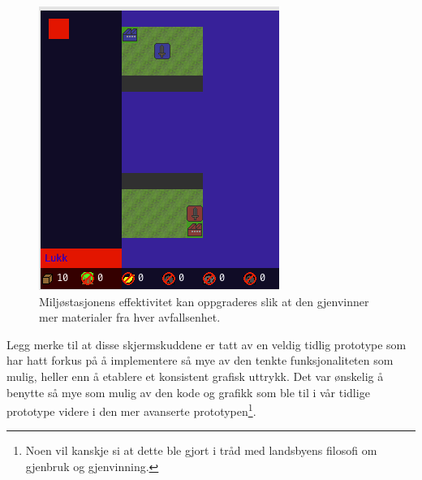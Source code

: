 \begin{figure} [H]
\centering
\includegraphics[scale=0.7]{images/OppgradereEnv.png}
\caption{Miljøstasjonens effektivitet kan oppgraderes slik at den gjenvinner mer materialer fra hver avfallsenhet.}
\label{fig:OppgradereEnv}
\end{figure}


Legg merke til at disse skjermskuddene er tatt av en veldig tidlig prototype som har hatt forkus på å implementere så mye av den tenkte funksjonaliteten som mulig, heller enn å etablere et konsistent grafisk uttrykk. Det var ønskelig å benytte så mye som mulig av den kode og grafikk som ble til i vår tidlige prototype videre i den mer avanserte prototypen\footnote{Noen vil kanskje si at dette ble gjort i tråd med landsbyens filosofi om gjenbruk og gjenvinning.}.
